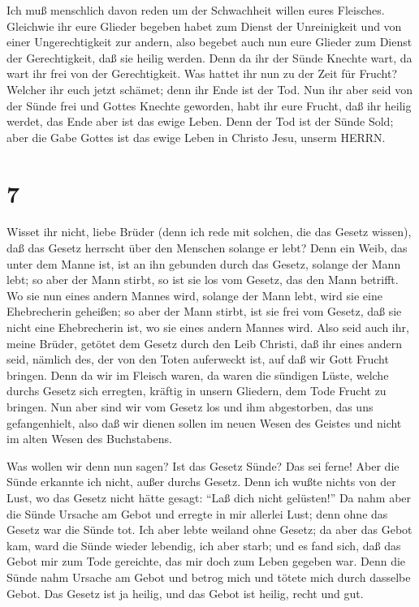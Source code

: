  Ich muß menschlich davon reden um der Schwachheit willen
eures Fleisches. Gleichwie ihr eure Glieder begeben habet zum Dienst der
Unreinigkeit und von einer Ungerechtigkeit zur andern, also begebet auch
nun eure Glieder zum Dienst der Gerechtigkeit, daß sie heilig werden.
 Denn da ihr der Sünde Knechte wart, da wart ihr frei von
der Gerechtigkeit.  Was hattet ihr nun zu der Zeit für
Frucht? Welcher ihr euch jetzt schämet; denn ihr Ende ist der Tod.
 Nun ihr aber seid von der Sünde frei und Gottes Knechte
geworden, habt ihr eure Frucht, daß ihr heilig werdet, das Ende aber ist
das ewige Leben.  Denn der Tod ist der Sünde Sold; aber die
Gabe Gottes ist das ewige Leben in Christo Jesu, unserm HERRN.

\hypertarget{section-6}{%
\section{7}\label{section-6}}

 Wisset ihr nicht, liebe Brüder (denn ich rede mit solchen,
die das Gesetz wissen), daß das Gesetz herrscht über den Menschen
solange er lebt?  Denn ein Weib, das unter dem Manne ist,
ist an ihn gebunden durch das Gesetz, solange der Mann lebt; so aber der
Mann stirbt, so ist sie los vom Gesetz, das den Mann betrifft.
 Wo sie nun eines andern Mannes wird, solange der Mann lebt,
wird sie eine Ehebrecherin geheißen; so aber der Mann stirbt, ist sie
frei vom Gesetz, daß sie nicht eine Ehebrecherin ist, wo sie eines
andern Mannes wird.  Also seid auch ihr, meine Brüder,
getötet dem Gesetz durch den Leib Christi, daß ihr eines andern seid,
nämlich des, der von den Toten auferweckt ist, auf daß wir Gott Frucht
bringen.  Denn da wir im Fleisch waren, da waren die
sündigen Lüste, welche durchs Gesetz sich erregten, kräftig in unsern
Gliedern, dem Tode Frucht zu bringen.  Nun aber sind wir vom
Gesetz los und ihm abgestorben, das uns gefangenhielt, also daß wir
dienen sollen im neuen Wesen des Geistes und nicht im alten Wesen des
Buchstabens.

 Was wollen wir denn nun sagen? Ist das Gesetz Sünde? Das
sei ferne! Aber die Sünde erkannte ich nicht, außer durchs Gesetz. Denn
ich wußte nichts von der Lust, wo das Gesetz nicht hätte gesagt: ``Laß
dich nicht gelüsten!''  Da nahm aber die Sünde Ursache am
Gebot und erregte in mir allerlei Lust; denn ohne das Gesetz war die
Sünde tot.  Ich aber lebte weiland ohne Gesetz; da aber das
Gebot kam, ward die Sünde wieder lebendig,  ich aber starb;
und es fand sich, daß das Gebot mir zum Tode gereichte, das mir doch zum
Leben gegeben war.  Denn die Sünde nahm Ursache am Gebot
und betrog mich und tötete mich durch dasselbe Gebot.  Das
Gesetz ist ja heilig, und das Gebot ist heilig, recht und gut.

